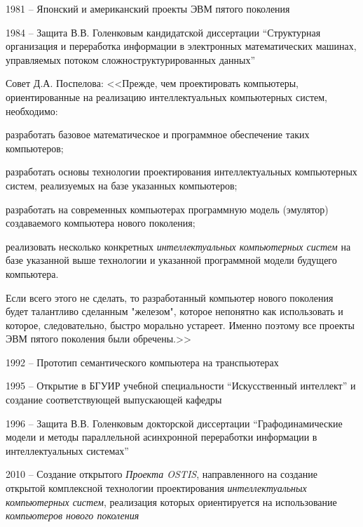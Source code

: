 \begin{textitemize}
\item 1981 -- Японский и американский проекты ЭВМ пятого поколения
\item 1984 -- Защита В.В. Голенковым кандидатской диссертации ``Структурная организация и переработка информации в электронных математических машинах, управляемых потоком сложноструктурированных данных''
\item Совет Д.А. Поспелова: <<Прежде, чем проектировать компьютеры, ориентированные на реализацию интеллектуальных компьютерных систем, необходимо:

	\begin{textitemize}
		\item разработать базовое математическое  и программное обеспечение таких компьютеров;
		\item разработать основы технологии проектирования интеллектуальных компьютерных систем, реализуемых на базе указанных компьютеров;
		\item разработать на современных компьютерах программную модель (эмулятор) создаваемого компьютера нового поколения;
		\item реализовать несколько конкретных \textit{интеллектуальных компьютерных систем} на базе указанной выше технологии и указанной программной модели будущего компьютера.
	\end{textitemize}
\vspace{-0.8\baselineskip}
Если всего этого не сделать, то разработанный компьютер нового поколения будет талантливо сделанным "железом"{}, которое непонятно как использовать и которое, следовательно, быстро морально устареет. Именно поэтому все проекты ЭВМ пятого поколения были обречены.>>
\vspace{0.5\baselineskip}
\item 1992 -- Прототип семантического компьютера на транспьютерах
\item 1995 -- Открытие в БГУИР учебной специальности ``Искусственный интеллект'' и создание соответствующей выпускающей кафедры
\item 1996 -- Защита В.В. Голенковым докторской диссертации ``Графодинамические модели и методы параллельной асинхронной переработки информации в интеллектуальных системах''
\item 2010 -- Создание открытого \textit{Проекта OSTIS}, направленного на создание открытой комплексной технологии проектирования \textit{интеллектуальных компьютерных систем}, реализация которых ориентируется на использование \textit{компьютеров нового поколения}

\end{textitemize}
